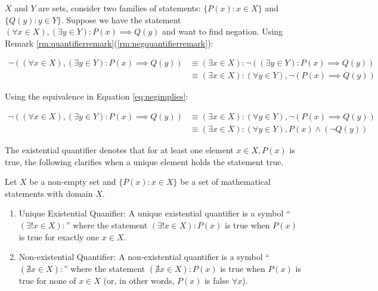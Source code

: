 \begin{example}
    $X$ and $Y$ are sets, consider two families of statements: $\{P(x):x \in X\}$ and $\{Q(y):y \in Y\}$.
    Suppose we have the statement $(\forall x \in X), (\exists y \in Y): P(x) \implies Q(y)$ and want to find negation.
    Using Remark \ref{rm:quantifierremark}(\ref{rm:negquantifierremark}):

    \begin{align*}
        \neg((\forall x \in X), (\exists y \in Y): P(x) \implies Q(y))
        &\equiv (\exists x \in X) : \neg((\exists y \in Y): P(x) \implies Q(y)) \\
        &\equiv (\exists x \in X) : (\forall y \in Y), \neg(P(x) \implies Q(y))
    \end{align*}

    Using the equivalence in Equation \ref{eq:negimplies}:

    \begin{align*}
        \neg((\forall x \in X), (\exists y \in Y): P(x) \implies Q(y))
        &\equiv (\exists x \in X) : (\forall y \in Y), \neg(P(x) \implies Q(y)) \\
        &\equiv (\exists x \in X) : (\forall y \in Y), P(x) \land (\neg Q(y))
    \end{align*}
\end{example}

The existential quantifier denotes that for at least one element $x \in X, P(x)$ is true, the following clarifies when a unique element holds the statement true.

\begin{definition}
    Let $X$ be a non-empty set and $\{P(x) : x \in X\}$ be a set of mathematical statements with domain $X$.

    \begin{enumerate}
        \item Unique Existential Quanifier: A unique existential quantifier is a symbol ``$(\exists! x \in X) :$'' where the statement $(\exists! x \in X) : P(x)$ is true when $P(x)$ is true for exactly one $x \in X$.

        \item Non-existential Quantifier: A non-existential quantifier is a symbol ``$(\nexists x \in X) :$'' where the statement $(\nexists x \in X) : P(x)$ is true when $P(x)$ is true for none of $x \in X$ (or, in other words, $P(x)$ is false $\forall x$).
    \end{enumerate}
\end{definition}

